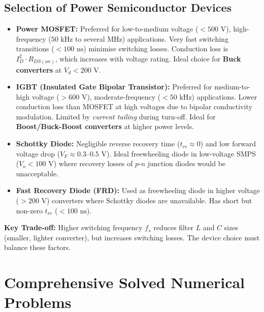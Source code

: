 \documentclass[11pt,a4paper]{article}
\begin{document}
\subsection{Selection of Power Semiconductor Devices}
\begin{conceptbox}
\begin{itemize}[leftmargin=*]
  \item \textbf{Power MOSFET:} Preferred for low-to-medium voltage ($< 500\text{ V}$), high-frequency ($50\text{ kHz}$ to several MHz) applications. Very fast switching transitions ($< 100\text{ ns}$) minimise switching losses. Conduction loss is $I_D^2 \cdot R_{DS(on)}$, which increases with voltage rating. Ideal choice for \textbf{Buck converters} at $V_d < 200\text{ V}$.
  \item \textbf{IGBT (Insulated Gate Bipolar Transistor):} Preferred for medium-to-high voltage ($> 600\text{ V}$), moderate-frequency ($< 50\text{ kHz}$) applications. Lower conduction loss than MOSFET at high voltages due to bipolar conductivity modulation. Limited by \textit{current tailing} during turn-off. Ideal for \textbf{Boost/Buck-Boost converters} at higher power levels.
  \item \textbf{Schottky Diode:} Negligible reverse recovery time ($t_{rr} \approx 0$) and low forward voltage drop ($V_F \approx 0.3\text{--}0.5\text{ V}$). Ideal freewheeling diode in low-voltage SMPS ($V_o < 100\text{ V}$) where recovery losses of $p$-$n$ junction diodes would be unacceptable.
  \item \textbf{Fast Recovery Diode (FRD):} Used as freewheeling diode in higher voltage ($> 200\text{ V}$) converters where Schottky diodes are unavailable. Has short but non-zero $t_{rr}$ ($< 100\text{ ns}$).
\end{itemize}
\textbf{Key Trade-off:} Higher switching frequency $f_s$ reduces filter $L$ and $C$ sizes (smaller, lighter converter), but increases switching losses. The device choice must balance these factors.
\end{conceptbox}

\newpage
\section{Comprehensive Solved Numerical Problems}
\end{document}
